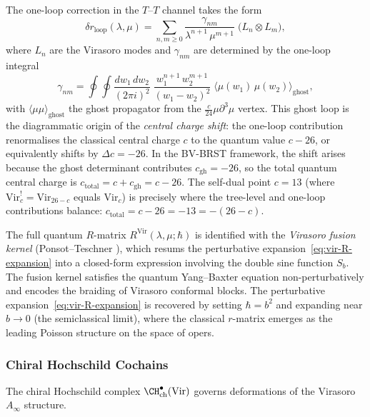The one-loop correction in the $T$--$T$ channel takes the form
\begin{equation}
\delta r_{\text{loop}}(\lambda,\mu)
= \sum_{n,m \ge 0}
 \frac{\gamma_{nm}}{\lambda^{n+1}\,\mu^{m+1}}
 \;\bigl(L_n \otimes L_m\bigr),
\end{equation}
where $L_n$ are the Virasoro modes and $\gamma_{nm}$ are determined
by the one-loop integral
\[
\gamma_{nm}
= \oint \oint
 \frac{dw_1\, dw_2}{(2\pi i)^2}\;
 \frac{w_1^{n+1}\, w_2^{m+1}}{(w_1 - w_2)^2}
 \;\langle \mu(w_1)\, \mu(w_2) \rangle_{\text{ghost}},
\]
with $\langle \mu \mu \rangle_{\text{ghost}}$ the ghost propagator
from the $\tfrac{c}{24}\mu\partial^3\mu$ vertex. This ghost loop
is the diagrammatic origin of the \emph{central charge shift}:
the one-loop contribution renormalises the classical central charge
$c$ to the quantum value $c - 26$, or equivalently shifts by
$\Delta c = -26$. In the BV-BRST framework, the shift arises
because the ghost determinant contributes $c_{\text{gh}} = -26$,
so the total quantum central charge is $c_{\text{total}} = c + c_{\text{gh}} = c - 26$.
The self-dual point $c = 13$ (where
$\mathrm{Vir}_c^! = \mathrm{Vir}_{26-c}$ equals $\mathrm{Vir}_c$)
is precisely where the tree-level and one-loop contributions balance:
$c_{\text{total}} = c - 26 = -13 = -(26 - c)$.

\begin{remark}
The full quantum $R$-matrix
$R^{\text{Vir}}(\lambda,\mu;\hbar)$ is identified with the
\emph{Virasoro fusion kernel} (Ponsot--Teschner
\cite{PT01}), which resums the
perturbative expansion~\eqref{eq:vir-R-expansion} into a
closed-form expression involving the double sine function
$S_b$. The fusion kernel satisfies the quantum Yang--Baxter
equation non-perturbatively and encodes the braiding of
Virasoro conformal blocks. The perturbative
expansion~\eqref{eq:vir-R-expansion} is recovered by setting
$\hbar = b^2$ and expanding near $b \to 0$ (the semiclassical
limit), where the classical $r$-matrix emerges as the
leading Poisson structure on the space of opers.
\end{remark}

\subsubsection{Chiral Hochschild Cochains}

The chiral Hochschild complex $\CH^\bullet_{\text{ch}}(\text{Vir})$ governs deformations of the Virasoro $A_\infty$ structure.

